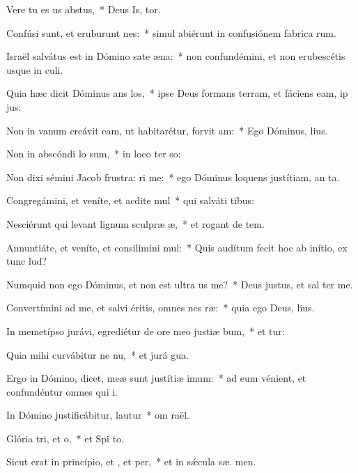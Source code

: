 \item Vere tu es us abstus,~* Deus Is, tor.
\item Confúsi sunt, et eruburunt nes:~* simul abiérunt in confusiónem fabrica rum.
\item Israël salvátus est in Dómino sate æna:~* non confundémini, et non erubescétis usque in  culi.
\item Quia hæc dicit Dóminus ans los,~* ipse Deus formans terram, et fáciens eam, ip  jus:
\item Non in vanum creávit eam, ut habitarétur, forvit am:~* Ego Dóminus,    lius.
\item Non in abscóndi lo sum,~* in loco ter so:
\item Non dixi sémini Jacob frustra: ri me:~* ego Dóminus loquens justítiam, an ta.
\item Congregámini, et veníte, et acdite mul~* qui salváti   tibus:
\item Nesciérunt qui levant lignum sculpræ æ,~* et rogant de  tem.
\item Annuntiáte, et veníte, et consilimini mul:~* Quis audítum fecit hoc ab inítio, ex tunc  lud?
\item Numquid non ego Dóminus, et non est ultra us  me?~* Deus justus, et sal   ter me.
\item Convertímini ad me, et salvi éritis, omnes nes ræ:~* quia ego Deus,    lius.
\item In memetípso jurávi, egrediétur de ore meo justiæ bum,~* et  tur:
\item Quia mihi curvábitur ne nu,~* et jurá  gua.
\item Ergo in Dómino, dicet, meæ sunt justítiæ  imum:~* ad eum vénient, et confundéntur omnes qui  i.
\item In Dómino justificábitur,  lautur~* om  raël.
\item Glória tri, et o,~* et Spi to.
\item Sicut erat in princípio, et , et per,~* et in sǽcula sæ. men.
